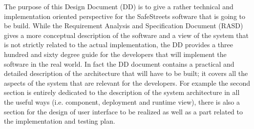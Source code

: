 The purpose of this Design Document (DD) is to give a rather technical and implementation oriented perspective for the SafeStreets software that is going to be build.
While the Requirement Analysis and Specification Document (RASD) gives a more conceptual description of the software and a view of the system that is not strictly related to the actual implementation, the DD provides a three hundred and sixty degree guide for the developers that will implement the software in the real world. In fact the DD document contains a practical and detailed description of the architecture that will have to be built; it covers all the aspects of the system that are relevant for the developers. For example the second section is entirely dedicated to the description of the system architecture in all the useful ways (i.e.  component, deployment and runtime view), there is also a section for the design of user interface to be realized as well as a part related to the implementation and testing plan.
